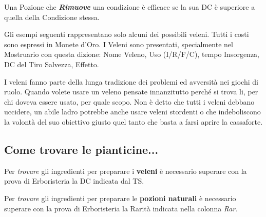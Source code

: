 \begin{multicols}{2}
Una Pozione che \emph{\textbf{Rimuove}} una condizione è efficace se la sua DC è superiore a quella della Condizione stessa. 

Gli esempi seguenti rappresentano solo alcuni dei possibili veleni. Tutti i costi sono espressi in Monete d'Oro. I Veleni sono presentati, specialmente nel Mostruario con questa dizione: Nome Veleno, Uso (I/R/F/C), tempo Insorgenza, DC del Tiro Salvezza, Effetto.

\begin{changemargin}{0.3cm}{0.3cm}\begin{narratore}
I veleni fanno parte della lunga tradizione dei problemi ed avversità nei giochi di ruolo. Quando volete usare un veleno pensate innanzitutto perché si trova li, per chi doveva essere usato, per quale scopo. Non è detto che tutti i veleni debbano uccidere, un abile ladro potrebbe anche usare veleni stordenti o che indeboliscono la volontà del suo obiettivo giusto quel tanto che basta a farsi aprire la cassaforte.
\end{narratore}\end{changemargin}

\subsection{Come trovare le pianticine...}

Per \emph{trovare} gli ingredienti per preparare i \textbf{veleni} è necessario superare con la prova di Erboristeria la DC indicata dal TS.

Per \emph{trovare} gli ingredienti per preparare le \textbf{pozioni naturali} è necessario superare con la prova di Erboristeria la Rarità indicata nella colonna \emph{Rar.}

\end{multicols}

